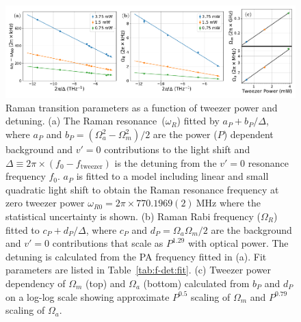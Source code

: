\documentclass[aps,prl,twocolumn,10pt,superscriptaddress]{revtex4-1}
\newcommand{\paren}[1]{{\left({#1}\right)}}
\newcommand{\todo}[1]{}
\begin{document}
\begin{figure}[htb]
  \includegraphics[width=\textwidth]{imgs/fig-det.pdf}
  \caption{Raman transition parameters as a function of tweezer power and detuning.
    (a) The Raman resonance~($\omega_R$) fitted by $a_P+b_P/\Delta$, where
    $a_P$ and $b_P=(\Omega_a^2-\Omega_m^2)/2$
    are the power ($P$) dependent background and $v'=0$ contributions
    to the light shift and
    $\Delta\equiv2\pi\times\paren{f_0 - f_{\mathrm{tweezer}}}$ is the detuning from
    the $v'=0$ resonance frequency $f_0$.
    $a_P$ is fitted to a model including linear and small quadratic light shift
    \todo{which assumes $\Omega_m\gg\Omega_a$} to obtain the Raman resonance frequency
    at zero tweezer power $\omega_{R0}=2\pi\times770.1969(2)~\mathrm{MHz}$ where the statistical uncertainty is shown.
    (b) Raman Rabi frequency ($\Omega_R$) fitted to $c_P+d_P/\Delta$, where
    $c_P$ and $d_P=\Omega_a\Omega_m/2$
    are the background and $v'=0$ contributions that scale as $P^{1.29}$ with optical power.
    The detuning is calculated from the PA frequency fitted in (a). Fit parameters are listed in Table~\ref{tab:f-det:fit}.
    (c) Tweezer power dependency of $\Omega_m$ (top) and $\Omega_a$ (bottom) calculated from
    $b_P$ and $d_P$ on a log-log scale showing approximate $P^{0.5}$ scaling of $\Omega_m$ and
    $P^{0.79}$ scaling of $\Omega_a$.
    \label{f-det}}
\end{figure}
\end{document}

